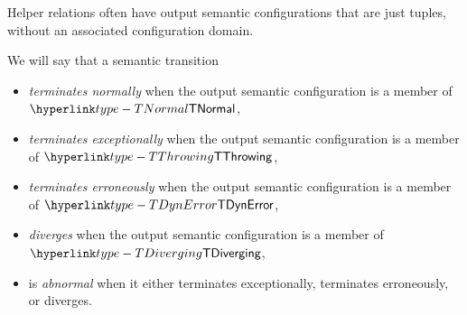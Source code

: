 Helper relations often have output semantic configurations that are just tuples, without an associated configuration domain.


We will say that a semantic transition
\begin{itemize}
\item \emph{terminates normally} when the output semantic configuration is a member of \\
      $\TNormal$,
\item \emph{terminates exceptionally} when the output semantic configuration is a member of $\TThrowing$,
\item \emph{terminates erroneously} when the output semantic configuration is a member of $\TDynError$,
\item \emph{diverges} when the output semantic configuration is a member of $\TDiverging$,
\item is \emph{abnormal} when it either terminates exceptionally, terminates erroneously, or diverges.
\end{itemize}

